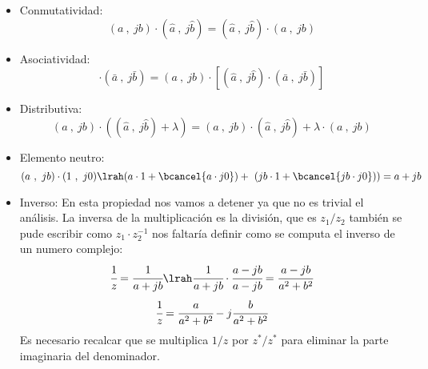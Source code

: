 \begin{itemize}
    \item Conmutatividad:
        \begin{equation}
            (a\ ,\ jb)\cdot(\hat{a}\ ,\ j\hat{b})=(\hat{a}\ ,\ j\hat{b})\cdot(a\ ,\ jb)
        \end{equation}
    \item Asociatividad:
        \begin{equation}
            [(a\ ,\ jb)\cdot(\hat{a}\ ,\ j\hat{b})]\cdot(\bar{a}\ ,\ j\bar{b})=(a\ ,\ jb)\cdot[(\hat{a}\ ,\ j\hat{b})\cdot(\bar{a}\ ,\ j\bar{b})]
        \end{equation}
    \item Distributiva:
    \begin{equation}
        (a\ ,\ jb)\cdot((\hat{a}\ ,\ j\hat{b})+\lambda)=  (a\ ,\ jb)\cdot(\hat{a}\ ,\ j\hat{b})+\lambda \cdot (a\ ,\ jb)
    \end{equation}
    \item Elemento neutro:
        \begin{equation}
             (a\ ,\ jb)\cdot(1\ ,\ j0) \lrah (a\cdot 1 + \bcancel{a\cdot j0}) +\ (jb\cdot 1+\bcancel{jb\cdot j0}))=a+jb 
        \end{equation}
    \item Inverso: 
    En esta propiedad nos vamos a detener ya que no es trivial el análisis.
    La inversa de la multiplicación es la división, que es $z_1/z_2$ también se pude escribir como $z_1\cdot z_2^{-1}$ nos faltaría definir como se computa el inverso de un numero complejo:
    \begin{equation*}
        \cfrac{1}{z}=\cfrac{1}{a+jb} \lrah \cfrac{1}{a+jb}\cdot\cfrac{a-jb}{a-jb}=\cfrac{a-jb}{a^2+b^2}
    \end{equation*}
    \begin{equation}
        \cfrac{1}{z}=\cfrac{a}{a^2+b^2}-j\cfrac{b}{a^2+b^2}
    \end{equation}
    Es necesario recalcar que se multiplica $1/z$ por $z^*/z^*$ para eliminar la parte imaginaria del denominador.
    

\end{itemize}
